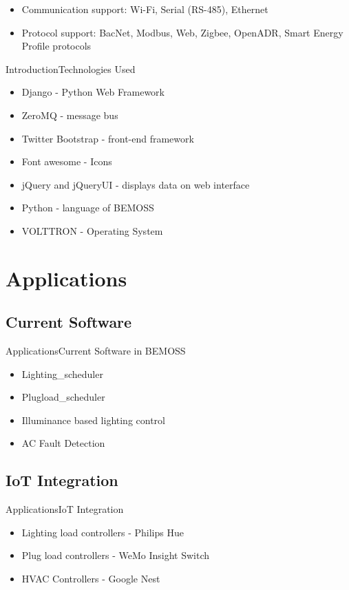 \documentclass{beamer}
\begin{document}
\begin{frame}
	\begin{itemize}
		\item Communication support: Wi-Fi, Serial (RS-485), Ethernet
		\item Protocol support: BacNet, Modbus, Web, Zigbee, OpenADR, Smart Energy Profile protocols	
	
	\end{itemize}
\end{frame}


\begin{frame}{Introduction}{Technologies Used}
	\begin{itemize}
		\item Django - Python Web Framework
		\item ZeroMQ - message bus
		\item Twitter Bootstrap - front-end framework
		\item Font awesome - Icons
		\item jQuery and jQueryUI - displays data on web interface
		\item Python - language of BEMOSS
		\item VOLTTRON - Operating System
	\end{itemize}
\end{frame}


\section{Applications}

\subsection{Current Software}
\begin{frame}{Applications}{Current Software in BEMOSS}
	\begin{itemize}
		\item Lighting\_scheduler
		\item Plugload\_scheduler
		\item Illuminance based lighting control
		\item AC Fault Detection
	\end{itemize}
\end{frame}

\subsection{IoT Integration}
\begin{frame}{Applications}{IoT Integration}
	\begin{itemize}
		\item Lighting load controllers - Philips Hue
		\item Plug load controllers - WeMo Insight Switch 
		\item HVAC Controllers - Google Nest
	\end{itemize}
\end{frame}
\end{document}
